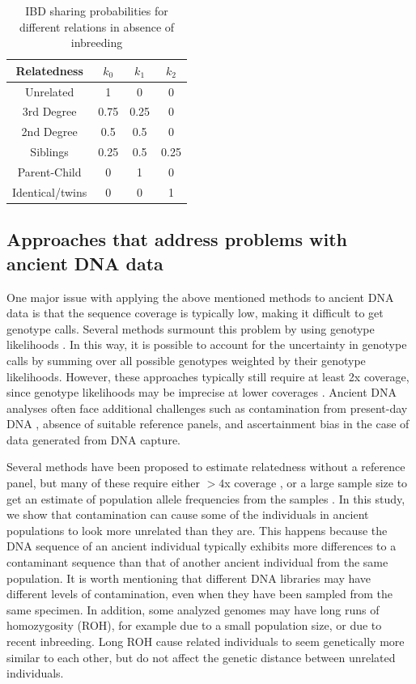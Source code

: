 \documentclass[12pt, letterpaper]{article}
\begin{document}
\begin{table}
\caption{\label{tab:Table 1}IBD sharing probabilities for different relations in absence of inbreeding}
\begin{tabular}{|c|c|c|c|}
    \hline
    Relatedness & $k_0$ & $k_1$ & $k_2$\\
    \hline
    Unrelated & 1 & 0 & 0\\
    \hline
    3rd Degree & 0.75 & 0.25 & 0\\
    \hline
    2nd Degree & 0.5 & 0.5 & 0\\
    \hline
    Siblings & 0.25 & 0.5 & 0.25\\
    \hline
    Parent-Child & 0 & 1 & 0\\
    \hline
    Identical/twins & 0 & 0 & 1\\
    \hline
\end{tabular}
\label{table1}
\end{table}

\subsection{Approaches that address problems with ancient DNA data}
One major issue with applying the above mentioned methods to ancient DNA data is that the sequence coverage is typically low, making it difficult to get genotype calls.
Several methods surmount this problem by using genotype likelihoods \cite{lipatov_maximum_2015,korneliussen_ngsrelate_2015}. In this way, it is possible to account for the uncertainty in genotype calls by summing over all possible genotypes weighted by their genotype likelihoods. However, these approaches typically still require at least 2x coverage, since genotype likelihoods may be imprecise at lower coverages . Ancient DNA analyses often face additional challenges such as contamination from present-day DNA \cite{peyregne_authentict_2020}, absence of suitable reference panels, and ascertainment bias in the case of data generated from DNA capture.

Several methods have been proposed to estimate relatedness without a reference panel, but many of these require either $>4$x coverage \cite{waples_allele_2019}, or a large sample size to get an estimate of population allele frequencies from the samples \cite{theunert_joint_2017}. In this study, we show that contamination can cause some of the individuals in ancient populations to look more unrelated than they are. This happens because the DNA sequence of an ancient individual typically exhibits more differences to a contaminant sequence than that of another ancient individual from the same population. It is worth mentioning that different DNA libraries may have different levels of contamination, even when they have been sampled from the same specimen. In addition, some analyzed  genomes  may have long runs of homozygosity (ROH), for example due to a small population size, or due to recent inbreeding. Long ROH cause related individuals to seem genetically more similar to each other, but do not affect the genetic distance between unrelated individuals.
\end{document}
